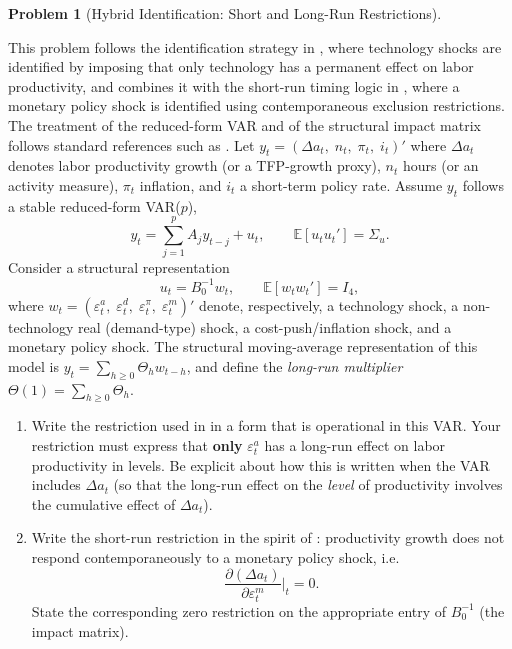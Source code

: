 \documentclass[12pt]{article}
\newcommand{\E}{\mathbb E}
\theoremstyle{definition} %
\newtheorem{problem}{Problem}
\theoremstyle{plain}
\begin{document}
\begin{problem}[Hybrid Identification: Short and Long-Run Restrictions]
\label{prob:svar-hybrid}

This problem follows the identification strategy in \citet{Gali1999}, where technology shocks are identified by imposing that only technology has a permanent effect on labor productivity, and combines it with the short-run timing logic in \citet{ChristianoEichenbaumEvans2005}, where a monetary policy shock is identified using contemporaneous exclusion restrictions. The treatment of the reduced-form VAR and of the structural impact matrix follows standard references such as \citet{Lutkepohl2005}. Let $y_t = (\Delta a_t,\; n_t,\; \pi_t,\; i_t)'$ where $\Delta a_t$ denotes labor productivity growth (or a TFP-growth proxy), $n_t$ hours (or an activity measure), $\pi_t$ inflation, and $i_t$ a short-term policy rate. Assume $y_t$ follows a stable reduced-form VAR($p$),
\begin{equation}
y_t = \sum_{j=1}^p A_j y_{t-j} + u_t,
\qquad \E[u_t u_t'] = \Sigma_u.
\end{equation}
Consider a structural representation
\begin{equation}
u_t = B_0^{-1} w_t,
\qquad \E[w_t w_t'] = I_4,
\end{equation}
where $w_t = (\varepsilon_t^a,\; \varepsilon_t^d,\; \varepsilon_t^\pi,\; \varepsilon_t^m)'$ denote, respectively, a technology shock, a non-technology real (demand-type) shock, a cost-push/inflation shock, and a monetary policy shock. The structural moving-average representation of this model is $y_t = \sum_{h\ge 0} \Theta_h w_{t-h}$, and define the \emph{long-run multiplier} $\Theta(1) = \sum_{h\ge 0} \Theta_h$.

\begin{enumerate}[label=(\alph*)]
\item Write the restriction used in \citet{Gali1999} in a form that is operational in this VAR. Your restriction must express that \textbf{only} $\varepsilon_t^a$ has a long-run effect on labor productivity in levels. Be explicit about how this is written when the VAR includes $\Delta a_t$ (so that the long-run effect on the \emph{level} of productivity involves the cumulative effect of $\Delta a_t$).

\item Write the short-run restriction in the spirit of \citet{ChristianoEichenbaumEvans2005}: productivity growth does not respond contemporaneously to a monetary policy shock, i.e.\
\[
\frac{\partial(\Delta a_t)}{\partial \varepsilon_t^m}\Big|_t = 0.
\]
State the corresponding zero restriction on the appropriate entry of $B_0^{-1}$ (the impact matrix).


\end{enumerate}
\end{problem}
\end{document}
